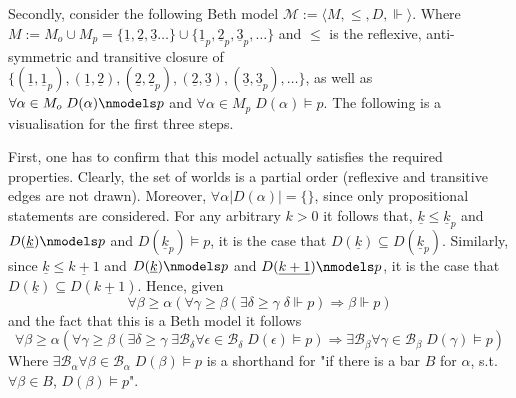 \documentclass[11pt,a4paper]{article}
\newcommand{\sto}{\Rightarrow}
\begin{document}
Secondly, consider the following Beth model $\mathcal{M}:= \langle  M , \leqslant, D, \Vdash \rangle$. Where $M:=M_o \cup M_p=\{\underline{1},\underline{2},\underline{3} \dots\}\cup \{\underline{1}_p,\underline{2}_p,\underline{3}_p,\dots\}$ and $\leqslant$ is the reflexive, anti-symmetric and transitive closure of $\{(\underline{1},\underline{1}_p), (\underline{1},\underline{2}), (\underline{2},\underline{2}_p), (\underline{2},\underline{3}), (\underline{3},\underline{3}_p) ,\dots\}$, as well as $\forall \alpha \in M_o \; D(\alpha)\nmodels p$ and $\forall \alpha \in M_p \; D(\alpha)\models p$.
The following is a visualisation for the first three steps.
\begin{center}
\end{center}

First, one has to confirm that this model actually satisfies the required properties. Clearly, the set of worlds is a partial order (reflexive and transitive edges are not drawn). 
Moreover, $\forall \alpha |D(\alpha)|=\{\}$, since only propositional statements are considered.
For any arbitrary $k >0$ it follows that, $\underline{k}\leqslant \underline{k}_p$ and $D(\underline{k}) \nmodels p$ and  $D(\underline{k}_p) \models p$, it is the case that $D(\underline{k}) \subseteq D(\underline{k}_p)$. Similarly, since $ \underline{k} \leqslant \underline{k+1}$ and $D( \underline{k}) \nmodels p$ and  $D( \underline{k+1}) \nmodels p$, it is the case that $D( \underline{k}) \subseteq D( \underline{k+1})$. Hence, given
\begin{equation*}
\forall \beta \geqslant \alpha ( \forall \gamma \geqslant \beta (\exists \delta \geqslant \gamma \; \delta \Vdash  p ) \sto  \beta \Vdash p ) 
\end{equation*}
and the fact that this is a Beth model it follows
\begin{equation*}
\forall \beta \geqslant \alpha ( \forall \gamma \geqslant \beta (\exists \delta \geqslant \gamma \; \exists \mathcal{B}_{\delta}\forall \epsilon \in  \mathcal{B}_{\delta} \; D(\epsilon) \models p) \sto  \exists \mathcal{B}_{\beta}\forall \gamma \in  \mathcal{B}_{\beta} \; D(\gamma) \models p) 
\end{equation*}
Where $\exists \mathcal{B}_{\alpha}\forall \beta \in  \mathcal{B}_{\alpha} \; D(\beta) \models p$ is a shorthand for  "if there is a bar $B$ for $\alpha$, s.t. $\forall \beta \in B$, $D(\beta) \models p$".\\
\end{document}

